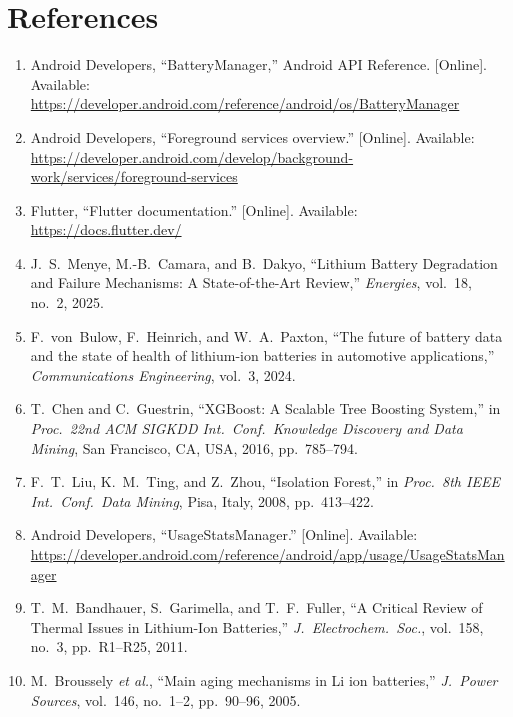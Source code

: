 \documentclass[12pt,a4paper]{report}
\begin{document}
\chapter*{References}
\renewcommand{\labelenumi}{[\theenumi]}
\begin{enumerate}

\item Android Developers, ``BatteryManager,'' Android API Reference. [Online].
  Available: \url{https://developer.android.com/reference/android/os/BatteryManager}

\item Android Developers, ``Foreground services overview.'' [Online].
  Available: \url{https://developer.android.com/develop/background-work/services/foreground-services}

\item Flutter, ``Flutter documentation.'' [Online].
  Available: \url{https://docs.flutter.dev/}

\item J.~S.~Menye, M.-B.~Camara, and B.~Dakyo, ``Lithium Battery Degradation and
  Failure Mechanisms: A State-of-the-Art Review,'' \textit{Energies}, vol.~18,
  no.~2, 2025.

\item F.~von~Bulow, F.~Heinrich, and W.~A.~Paxton, ``The future of battery data
  and the state of health of lithium-ion batteries in automotive applications,''
  \textit{Communications Engineering}, vol.~3, 2024.

\item T.~Chen and C.~Guestrin, ``XGBoost: A Scalable Tree Boosting System,''
  in \textit{Proc.\ 22nd ACM SIGKDD Int.\ Conf.\ Knowledge Discovery and Data
  Mining}, San Francisco, CA, USA, 2016, pp.~785--794.

\item F.~T.~Liu, K.~M.~Ting, and Z.~Zhou, ``Isolation Forest,'' in
  \textit{Proc.\ 8th IEEE Int.\ Conf.\ Data Mining}, Pisa, Italy, 2008,
  pp.~413--422.

\item Android Developers, ``UsageStatsManager.'' [Online].
  Available: \url{https://developer.android.com/reference/android/app/usage/UsageStatsManager}

\item T.~M.~Bandhauer, S.~Garimella, and T.~F.~Fuller, ``A Critical Review of
  Thermal Issues in Lithium-Ion Batteries,'' \textit{J.\ Electrochem.\ Soc.},
  vol.~158, no.~3, pp.~R1--R25, 2011.

\item M.~Broussely \textit{et al.}, ``Main aging mechanisms in Li ion batteries,''
  \textit{J.\ Power Sources}, vol.~146, no.~1--2, pp.~90--96, 2005.

\end{enumerate}
\end{document}
